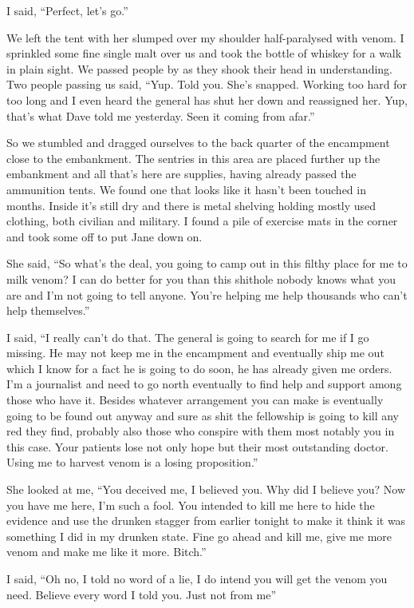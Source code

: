 I said, ``Perfect, let's go.''

We left the tent with her slumped over my shoulder half-paralysed with venom. I sprinkled some fine single malt over us and took the bottle of whiskey for a walk in plain sight. We passed people by as they shook their head in understanding. Two people passing us said, ``Yup. Told you. She's snapped. Working too hard for too long and I even heard the general has shut her down and reassigned her. Yup, that's what Dave told me yesterday. Seen it coming from afar.''

So we stumbled and dragged ourselves to the back quarter of the encampment close to the embankment. The sentries in this area are placed further up the embankment and all that's here are supplies, having already passed the ammunition tents. We found one that looks like it hasn't been touched in months. Inside it's still dry and there is metal shelving holding mostly used clothing, both civilian and military. I found a pile of exercise mats in the corner and took some off to put Jane down on.

She said, ``So what's the deal, you going to camp out in this filthy place for me to milk venom? I can do better for you than this shithole nobody knows what you are and I'm not going to tell anyone. You're helping me help thousands who can't help themselves.''

I said, ``I really can't do that. The general is going to search for me if I go missing. He may not keep me in the encampment and eventually ship me out which I know for a fact he is going to do soon, he has already given me orders. I'm a journalist and need to go north eventually to find help and support among those who have it. Besides whatever arrangement you can make is eventually going to be found out anyway and sure as shit the fellowship is going to kill any red they find, probably also those who conspire with them most notably you in this case. Your patients lose not only hope but their most outstanding doctor. Using me to harvest venom is a losing proposition.''

She looked at me, ``You deceived me, I believed you. Why did I believe you? Now you have me here, I'm such a fool. You intended to kill me here to hide the evidence and use the drunken stagger from earlier tonight to make it think it was something I did in my drunken state. Fine go ahead and kill me, give me more venom and make me like it more. Bitch.''

I said, ``Oh no, I told no word of a lie, I do intend you will get the venom you need. Believe every word I told you. Just not from me''

